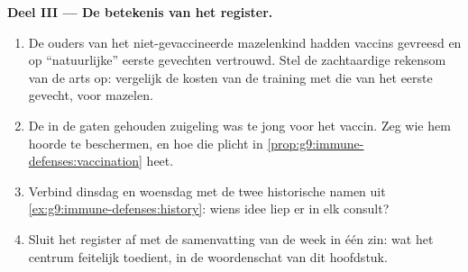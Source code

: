 \begin{problem}
\medskip\noindent\textbf{Deel III --- De betekenis van het
register.}
\begin{enumerate}[resume]
  \item De ouders van het niet-gevaccineerde mazelenkind hadden
        vaccins gevreesd en op ``natuurlijke'' eerste gevechten
        vertrouwd. Stel de zachtaardige rekensom van de arts op:
        vergelijk de kosten van de training met die van het eerste
        gevecht, voor mazelen.
  \item De in de gaten gehouden zuigeling was te jong voor het
        vaccin. Zeg wie hem hoorde te beschermen, en hoe die plicht
        in \cref{prop:g9:immune-defenses:vaccination} heet.
  \item Verbind dinsdag en woensdag met de twee historische namen
        uit \cref{ex:g9:immune-defenses:history}: wiens idee liep
        er in elk consult?
  \item Sluit het register af met de samenvatting van de week in
        één zin: wat het centrum feitelijk toedient, in de
        woordenschat van dit hoofdstuk.
\end{enumerate}
\end{problem}
